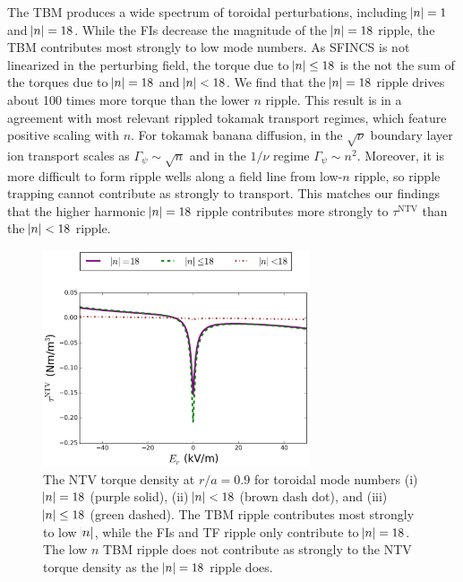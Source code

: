 \documentclass[aip, pop, preprint]{revtex4-1}
\numberwithin{figure}{section}
\numberwithin{equation}{section}
\begin{document}
The TBM produces a wide spectrum of toroidal perturbations, including $\abs{n} = 1$ and $\abs{n} = 18$. While the FIs decrease the magnitude of the $\abs{n} =18$ ripple, the TBM contributes most strongly to low mode numbers. As SFINCS is not linearized in the perturbing field, the torque due to $\abs{n} \leq 18$ is the not the sum of the torques due to $\abs{n} = 18$ and $\abs{n} < 18$.  We find that the $\abs{n} = 18$ ripple drives about 100 times more torque than the lower $n$ ripple. This result is in a agreement with most relevant rippled tokamak transport regimes, which feature positive scaling with $n$. For tokamak banana diffusion, in the $\sqrt{\nu}$ boundary layer \cite{Shaing2008} ion transport scales as $\Gamma_{\psi} \sim \sqrt{n}$ and in the $1/\nu$ regime \cite{Shaing2003} $\Gamma_{\psi} \sim n^2$. Moreover, it is more difficult to form ripple wells along a field line from low-$n$ ripple, so ripple trapping cannot contribute as strongly to transport. This matches our findings that the higher harmonic $\abs{n} = 18$ ripple contributes more strongly to $\tau^{\mathrm{NTV}}$ than the $\abs{n} < 18$ ripple. 

\begin{figure}[h!]
\centering
\includegraphics[width=0.7\textwidth]{figure8.eps}
\caption{\label{fig:Torque_comparingTBMandFI} The NTV torque density at $r/a = 0.9$ for toroidal mode numbers (i) $\abs{n} = 18$ (purple solid), (ii) $\abs{n} < 18$ (brown dash dot), and (iii) $\abs{n} \leq 18$ (green dashed). The TBM ripple contributes most strongly to low $\abs{n}$, while the FIs and TF ripple only contribute to $\abs{n} = 18$. The low $n$ TBM ripple does not contribute as strongly to the NTV torque density as the $\abs{n} = 18$ ripple does.}
\end{figure}
\end{document}
